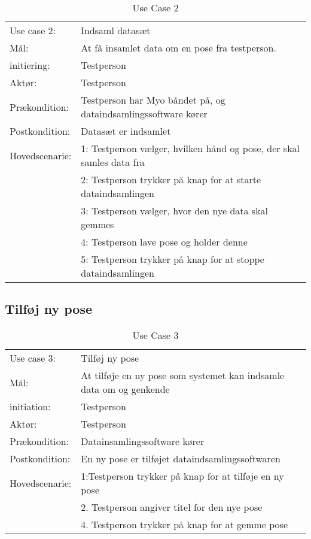 \begin{center}
	\begin{table}[htbp]
		\begin{tabular}{lp{274pt}}
			\rowcolor{grey} Use case 2:		& Indsaml datasæt \\
			Mål: 	& At få insamlet data om en pose fra testperson. \\
			initiering:	& Testperson\\
			Aktør: & Testperson\\
			Prækondition: & Testperson har Myo båndet på, og dataindsamlingssoftware kører\\
			Postkondition: & Datasæt er indsamlet\\
			Hovedscenarie: & 1: Testperson vælger, hvilken hånd og pose, der skal samles data fra\\
			& 2: Testperson trykker på knap for at starte dataindsamlingen\\
			& 3: Testperson vælger, hvor den nye data skal gemmes\\
			& 4: Testperson lave pose og holder denne\\
			& 5: Testperson trykker på knap for at stoppe dataindsamlingen\\
		\end{tabular}
		\caption{Use Case 2}
	\end{table}
\end{center}

\subsection{Tilføj ny pose}
\begin{center}
	\begin{table}[htbp]
		\begin{tabular}{lp{274pt}}
			\rowcolor{grey} Use case 3:		& Tilføj ny pose\\
			Mål: 	& At tilføje en ny pose som systemet kan indsamle data om og genkende \\
			initiation:	& Testperson\\
			Aktør: & Testperson\\
			Prækondition: & Datainsamlingssoftware kører \\
			Postkondition: & En ny pose er tilføjet dataindsamlingssoftwaren\\
			Hovedscenarie: & 1:Testperson trykker på knap for at tilføje en ny pose\\
			& 2. Testperson angiver titel for den nye pose\\
			& 4. Testperson trykker på knap for at gemme pose\\
		\end{tabular}
		\caption{Use Case 3}
	\end{table}
\end{center}

